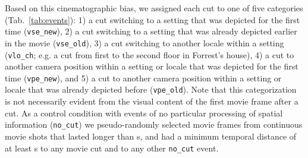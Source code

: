 \documentclass[english]{article}
\begin{document}
Based on this cinematographic bias, we assigned each cut to one of five
categories (Tab.~\ref{tab:events}):
%
1) a cut switching to a setting that was depicted for the first time
(\texttt{vse\_new}),
%
2) a cut switching to a setting that was already depicted earlier in the movie
(\texttt{vse\_old}),
%
3) a cut switching to another locale within a setting (\texttt{vlo\_ch}; e.g. a
cut from first to the second floor in Forrest's house),
%
4) a cut to another camera position within a setting or locale that was depicted
for the first time (\texttt{vpe\_new}), and
%
5) a cut to another camera position within a setting or locale that was already
depicted before (\texttt{vpe\_old}).
Note that this categorization is not necessarily evident from the visual content
of the first movie frame after a cut.
As a control condition with events of no particular processing of spatial
information (\texttt{no\_cut}) we pseudo-randomly selected movie frames from
continuous movie shots that lasted longer than \unit[20]{s}, and
had a minimum temporal distance of at least \unit[10]{s} to any movie cut and to
any other \texttt{no\_cut} event.
\end{document}
